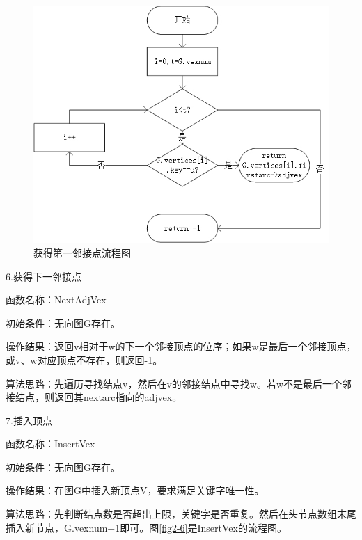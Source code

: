 \documentclass[supercite]{Experimental_Report}
\theoremstyle{definition}
\begin{document}
\begin{figure}[htb] %
	\begin{center}
		\includegraphics[scale=0.9]{./images/图/First.jpg}
		\caption{获得第一邻接点流程图}
		\label{fig2-5}
	\end{center}
\end{figure}

6.获得下一邻接点

函数名称：NextAdjVex

初始条件：无向图G存在。

操作结果：返回v相对于w的下一个邻接顶点的位序；如果w是最后一个邻接顶点，或v、w对应顶点不存在，则返回-1。

算法思路：先遍历寻找结点v，然后在v的邻接结点中寻找w。若w不是最后一个邻接结点，则返回其nextarc指向的adjvex。

7.插入顶点

函数名称：InsertVex

初始条件：无向图G存在。

操作结果：在图G中插入新顶点V，要求满足关键字唯一性。

算法思路：先判断结点数是否超出上限，关键字是否重复。然后在头节点数组末尾插入新节点，G.vexnum+1即可。图\ref{fig2-6}是InsertVex的流程图。
\end{document}
